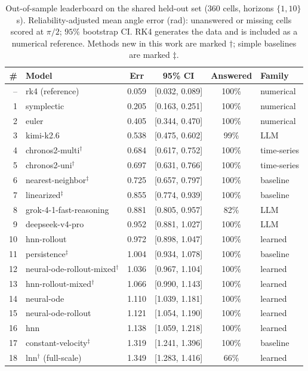 \documentclass{article}
\begin{document}
\begin{table}[tbp]
\centering\small
\caption{Out-of-sample leaderboard on the shared held-out set ($360$ cells, horizons
$\{1,10\}$\,s). Reliability-adjusted mean angle error (rad): unanswered or missing cells
scored at $\pi/2$; $95\%$ bootstrap CI. RK4 generates the data and is included
as a numerical reference. Methods new in this work are marked $\dagger$; simple baselines are
marked $\ddagger$.}\label{tab:overall}
\begin{tabular}{rlcccl}
\toprule
\# & Model & Err & 95\% CI & Answered & Family \\
\midrule
-- & rk4 (reference) & 0.059 & [0.032, 0.089] & 100\% & numerical \\
1 & symplectic & 0.205 & [0.163, 0.251] & 100\% & numerical \\
2 & euler & 0.405 & [0.344, 0.470] & 100\% & numerical \\
3 & kimi-k2.6 & 0.538 & [0.475, 0.602] & 99\% & LLM \\
4 & chronos2-multi$^\dagger$ & 0.684 & [0.617, 0.752] & 100\% & time-series \\
5 & chronos2-uni$^\dagger$ & 0.697 & [0.631, 0.766] & 100\% & time-series \\
6 & nearest-neighbor$^\ddagger$ & 0.725 & [0.657, 0.797] & 100\% & baseline \\
7 & linearized$^\ddagger$ & 0.855 & [0.774, 0.939] & 100\% & baseline \\
8 & grok-4-1-fast-reasoning & 0.881 & [0.805, 0.957] & 82\% & LLM \\
9 & deepseek-v4-pro & 0.952 & [0.881, 1.027] & 100\% & LLM \\
10 & hnn-rollout & 0.972 & [0.898, 1.047] & 100\% & learned \\
11 & persistence$^\ddagger$ & 1.004 & [0.934, 1.078] & 100\% & baseline \\
12 & neural-ode-rollout-mixed$^\dagger$ & 1.036 & [0.967, 1.104] & 100\% & learned \\
13 & hnn-rollout-mixed$^\dagger$ & 1.066 & [0.990, 1.143] & 100\% & learned \\
14 & neural-ode & 1.110 & [1.039, 1.181] & 100\% & learned \\
15 & neural-ode-rollout & 1.121 & [1.054, 1.190] & 100\% & learned \\
16 & hnn & 1.138 & [1.059, 1.218] & 100\% & learned \\
17 & constant-velocity$^\ddagger$ & 1.319 & [1.241, 1.396] & 100\% & baseline \\
18 & lnn$^\dagger$ (full-scale) & 1.349 & [1.283, 1.416] & 66\% & learned \\
\bottomrule
\end{tabular}
\end{table}
\end{document}
